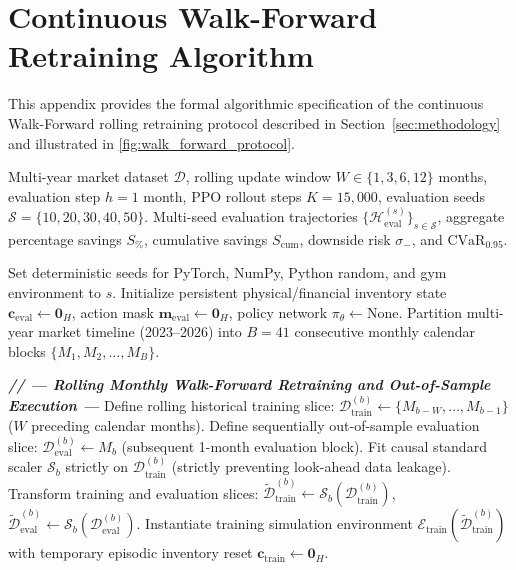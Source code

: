 \appendix
\section{Continuous Walk-Forward Retraining Algorithm}
\label{app:walk_forward}

This appendix provides the formal algorithmic specification of the continuous Walk-Forward rolling retraining protocol described in Section~\ref{sec:methodology} and illustrated in \cref{fig:walk_forward_protocol}.

\bigskip
\begin{algorithm*}[t]
\caption{Continuous Walk-Forward Rolling Retraining Protocol}
\label{alg:walk_forward}
\footnotesize
\begin{algorithmic}[1]
\Require Multi-year market dataset $\mathcal{D}$, rolling update window $W \in \{1, 3, 6, 12\}$ months, evaluation step $h = 1$ month, PPO rollout steps $K = 15{,}000$, evaluation seeds $\mathcal{S} = \{10, 20, 30, 40, 50\}$.
\Ensure Multi-seed evaluation trajectories $\{\mathcal{H}_{\text{eval}}^{(s)}\}_{s \in \mathcal{S}}$, aggregate percentage savings $S_{\%}$, cumulative savings $S_{\text{cum}}$, downside risk $\sigma_-$, and $\text{CVaR}_{0.95}$.

\Statex
{}
    \State Set deterministic seeds for PyTorch, NumPy, Python random, and gym environment to $s$.
    \State Initialize persistent physical/financial inventory state $\mathbf{c}_{\text{eval}} \leftarrow \mathbf{0}_{H}$, action mask $\mathbf{m}_{\text{eval}} \leftarrow \mathbf{0}_{H}$, policy network $\pi_\theta \leftarrow \text{None}$.
    \State Partition multi-year market timeline (2023--2026) into $B = 41$ consecutive monthly calendar blocks $\{M_1, M_2, \dots, M_B\}$.
    
    \Statex
    \Statex \textbf{\quad\textit{// --- Rolling Monthly Walk-Forward Retraining and Out-of-Sample Execution ---}}
        \State Define rolling historical training slice: $\mathcal{D}_{\text{train}}^{(b)} \leftarrow \{M_{b-W}, \dots, M_{b-1}\}$ ($W$ preceding calendar months).
        \State Define sequentially out-of-sample evaluation slice: $\mathcal{D}_{\text{eval}}^{(b)} \leftarrow M_b$ (subsequent 1-month evaluation block).
        \State Fit causal standard scaler $\mathcal{S}_b$ strictly on $\mathcal{D}_{\text{train}}^{(b)}$ (strictly preventing look-ahead data leakage).
        \State Transform training and evaluation slices: $\widetilde{\mathcal{D}}_{\text{train}}^{(b)} \leftarrow \mathcal{S}_b(\mathcal{D}_{\text{train}}^{(b)})$, $\widetilde{\mathcal{D}}_{\text{eval}}^{(b)} \leftarrow \mathcal{S}_b(\mathcal{D}_{\text{eval}}^{(b)})$.
        \State Instantiate training simulation environment $\mathcal{E}_{\text{train}}(\widetilde{\mathcal{D}}_{\text{train}}^{(b)})$ with temporary episodic inventory reset $\mathbf{c}_{\text{train}} \leftarrow \mathbf{0}_H$.
        

\end{algorithmic}
\end{algorithm*}
